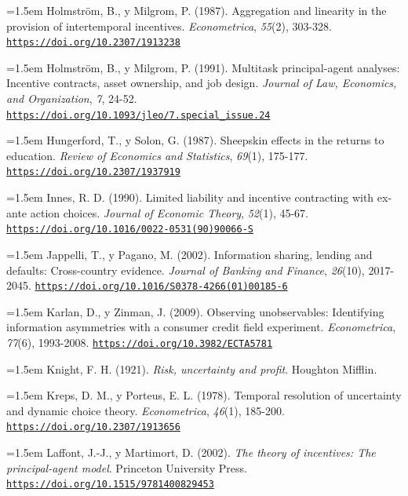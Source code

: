 \documentclass[10pt,a4paper]{article}
\begin{document}
\noindent\hangindent=1.5em Holmström, B., y Milgrom, P. (1987). Aggregation and linearity in the provision of intertemporal incentives. \textit{Econometrica}, \textit{55}(2), 303-328. \href{https://doi.org/10.2307/1913238}{\nolinkurl{https://doi.org/10.2307/1913238}}

\noindent\hangindent=1.5em Holmström, B., y Milgrom, P. (1991). Multitask principal-agent analyses: Incentive contracts, asset ownership, and job design. \textit{Journal of Law, Economics, and Organization}, \textit{7}, 24-52. \href{https://doi.org/10.1093/jleo/7.special_issue.24}{\nolinkurl{https://doi.org/10.1093/jleo/7.special_issue.24}}

\noindent\hangindent=1.5em Hungerford, T., y Solon, G. (1987). Sheepskin effects in the returns to education. \textit{Review of Economics and Statistics}, \textit{69}(1), 175-177. \href{https://doi.org/10.2307/1937919}{\nolinkurl{https://doi.org/10.2307/1937919}}

\noindent\hangindent=1.5em Innes, R. D. (1990). Limited liability and incentive contracting with ex-ante action choices. \textit{Journal of Economic Theory}, \textit{52}(1), 45-67. \href{https://doi.org/10.1016/0022-0531(90)90066-S}{\nolinkurl{https://doi.org/10.1016/0022-0531(90)90066-S}}

\noindent\hangindent=1.5em Jappelli, T., y Pagano, M. (2002). Information sharing, lending and defaults: Cross-country evidence. \textit{Journal of Banking and Finance}, \textit{26}(10), 2017-2045. \href{https://doi.org/10.1016/S0378-4266(01)00185-6}{\nolinkurl{https://doi.org/10.1016/S0378-4266(01)00185-6}}

\noindent\hangindent=1.5em Karlan, D., y Zinman, J. (2009). Observing unobservables: Identifying information asymmetries with a consumer credit field experiment. \textit{Econometrica}, \textit{77}(6), 1993-2008. \href{https://doi.org/10.3982/ECTA5781}{\nolinkurl{https://doi.org/10.3982/ECTA5781}}

\noindent\hangindent=1.5em Knight, F. H. (1921). \textit{Risk, uncertainty and profit}. Houghton Mifflin.

\noindent\hangindent=1.5em Kreps, D. M., y Porteus, E. L. (1978). Temporal resolution of uncertainty and dynamic choice theory. \textit{Econometrica}, \textit{46}(1), 185-200. \href{https://doi.org/10.2307/1913656}{\nolinkurl{https://doi.org/10.2307/1913656}}

\noindent\hangindent=1.5em Laffont, J.-J., y Martimort, D. (2002). \textit{The theory of incentives: The principal-agent model}. Princeton University Press. \href{https://doi.org/10.1515/9781400829453}{\nolinkurl{https://doi.org/10.1515/9781400829453}}
\end{document}
